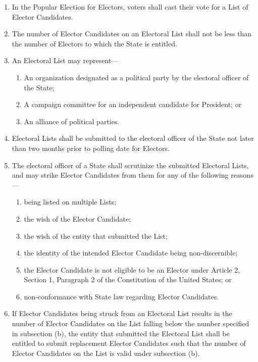 \documentclass{article}
\begin{document}
    \begin{enumerate}
        \item In the Popular Election for Electors, voters shall cast their vote for a List of Elector Candidates.
        \item The number of Elector Candidates on an Electoral List shall not be less than the number of Electors to which the State is entitled.
        \item An Electoral List may represent---
        \begin{enumerate}
            \item An organization designated as a political party by the electoral officer of the State;
            \item A campaign committee for an independent candidate for President; or
            \item An alliance of political parties.
        \end{enumerate}
        \item Electoral Lists shall be submitted to the electoral officer of the State not later than two months prior to polling date for Electors.
        \item The electoral officer of a State shall scrutinize the submitted Electoral Lists, and may strike Elector Candidates from them for any of the following reasons---
        \begin{enumerate}
            \item being listed on multiple Lists;
            \item the wish of the Elector Candidate;
            \item the wish of the entity that submitted the List;
            \item the identity of the intended Elector Candidate being non-discernible;
            \item the Elector Candidate is not eligible to be an Elector under Article 2, Section 1, Paragraph 2 of the Constitution of the United States; or
            \item non-conformance with State law regarding Elector Candidates.
        \end{enumerate}
        \item If Elector Candidates being struck from an Electoral List results in the number of Elector Candidates on the List falling below the number specified in subsection (b), the entity that submitted the Electoral List shall be entitled to submit replacement Elector Candidates such that the number of Elector Candidates on the List is valid under subsection (b).

\end{enumerate}
\end{document}
